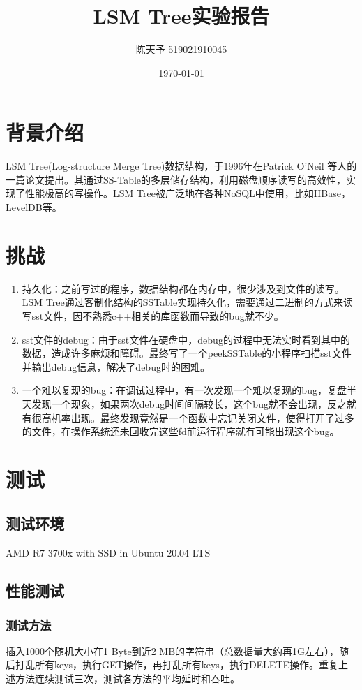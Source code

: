\documentclass{ctexart}
\title{LSM Tree实验报告}
\author{陈天予 519021910045}
\date{\today}
\begin{document}
\maketitle

\section{背景介绍}
LSM Tree(Log-structure Merge Tree)数据结构，于1996年在Patrick O’Neil 等人的一篇论文提出。其通过SS-Table的多层储存结构，利用磁盘顺序读写的高效性，实现了性能极高的写操作。LSM Tree被广泛地在各种NoSQL中使用，比如HBase，LevelDB等。

\section{挑战}
\begin{enumerate}
  \item 持久化：之前写过的程序，数据结构都在内存中，很少涉及到文件的读写。LSM Tree通过客制化结构的SSTable实现持久化，需要通过二进制的方式来读写sst文件，因不熟悉c++相关的库函数而导致的bug就不少。
  \item sst文件的debug：由于sst文件在硬盘中，debug的过程中无法实时看到其中的数据，造成许多麻烦和障碍。最终写了一个peekSSTable的小程序扫描sst文件并输出debug信息，解决了debug时的困难。
  \item 一个难以复现的bug：在调试过程中，有一次发现一个难以复现的bug，复盘半天发现一个现象，如果两次debug时间间隔较长，这个bug就不会出现，反之就有很高机率出现。最终发现竟然是一个函数中忘记关闭文件，使得打开了过多的文件，在操作系统还未回收完这些fd前运行程序就有可能出现这个bug。
\end{enumerate}

\section{测试}

\subsection{测试环境}
AMD R7 3700x with SSD in Ubuntu 20.04 LTS

\subsection{性能测试}

\subsubsection{测试方法}
插入1000个随机大小在1 Byte到近2 MB的字符串（总数据量大约再1G左右），随后打乱所有keys，执行GET操作，再打乱所有keys，执行DELETE操作。重复上述方法连续测试三次，测试各方法的平均延时和吞吐。
\end{document}
